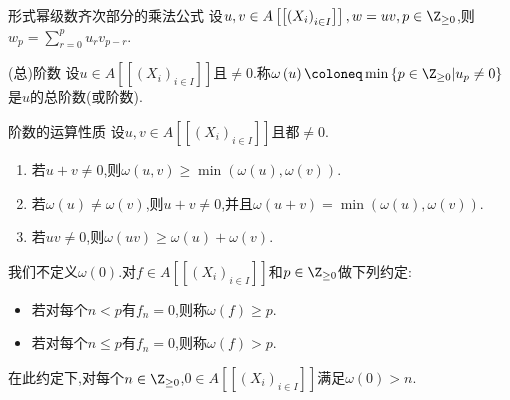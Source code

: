 \begin{proposition}{形式幂级数齐次部分的乘法公式}{}
	设$u,v\in A\left[\left[\left(X_{i}\right)_{i\in I}\right]\right],w=uv,p\in\Z_{\geq 0}$,则$w_{p}=\sum\limits_{r=0}^{p}u_{r}v_{p-r}$.
\end{proposition}

\begin{definition}{(总)阶数}{}
	设$u\in A\left[\left[\left(X_{i}\right)_{i\in I}\right]\right]$且$\neq 0$.称$\omega\left(u\right)\coloneq\min\left\{p\in\Z_{\geq 0}\middle|u_{p}\neq 0\right\}$是$u$的总阶数(或阶数).
\end{definition}

\begin{proposition}{阶数的运算性质}{}
	设$u,v\in A\left[\left[\left(X_{i}\right)_{i\in I}\right]\right]$且都$\neq 0$.
	\begin{enumerate}
		\item 若$u+v\neq 0$,则$\omega\left(u,v\right)\geq\min\left(\omega\left(u\right),\omega\left(v\right)\right)$.
		\item 若$\omega\left(u\right)\neq\omega\left(v\right)$,则$u+v\neq 0$,并且$\omega\left(u+v\right)=\min\left(\omega\left(u\right),\omega\left(v\right)\right)$.
		\item 若$uv\neq 0$,则$\omega\left(uv\right)\geq\omega\left(u\right)+\omega\left(v\right)$.
	\end{enumerate}
\end{proposition}

\begin{convention}{}{}
	我们不定义$\omega\left(0\right)$.对$f\in A\left[\left[\left(X_{i}\right)_{i\in I}\right]\right]$和$p\in\Z_{\geq 0}$做下列约定:
	\begin{itemize}
		\item 若对每个$n<p$有$f_{n}=0$,则称$\omega\left(f\right)\geq p$.
		\item 若对每个$n\leq p$有$f_{n}=0$,则称$\omega\left(f\right)>p$.
	\end{itemize}
	在此约定下,对每个$n\in\Z_{\geq 0}$,$0\in A\left[\left[\left(X_{i}\right)_{i\in I}\right]\right]$满足$\omega\left(0\right)>n$.
\end{convention}

